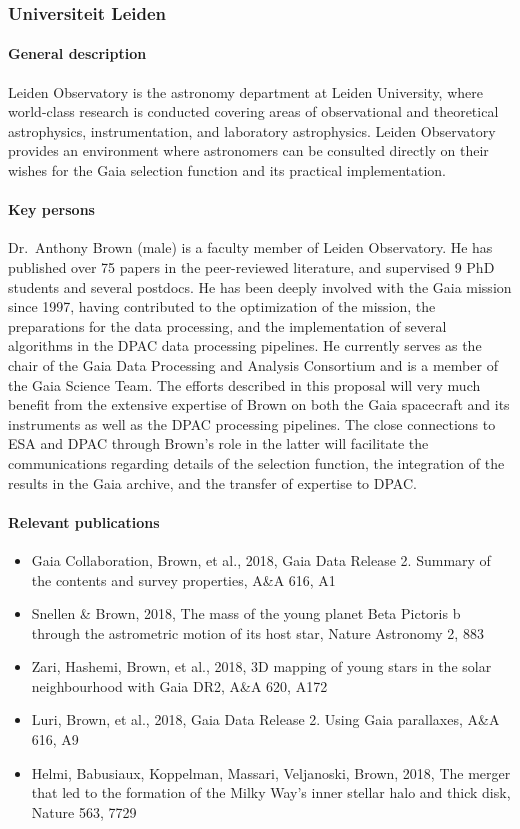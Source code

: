 \subsubsection{Universiteit Leiden}
\label{sec:ulei}

\paragraph{General description}
Leiden Observatory is the astronomy department at Leiden University, 
where world-class research is conducted covering areas of observational 
and theoretical astrophysics, instrumentation, and laboratory astrophysics. 
Leiden Observatory provides an environment where astronomers can
be consulted directly on their wishes for the Gaia selection function and
its practical implementation.

\paragraph{Key persons}
Dr.~Anthony Brown (male) is a faculty member of Leiden Observatory. He has published over 75 papers in the peer-reviewed literature, and supervised 9 PhD students and several postdocs. He has been deeply involved with the Gaia mission since 1997, having contributed to the optimization of the mission, the preparations for the data processing, and the implementation of several algorithms in the DPAC data processing pipelines. He currently serves as the chair of the Gaia Data Processing and Analysis Consortium and is a member of the Gaia Science Team. The efforts described in this proposal will very much benefit from the extensive expertise of Brown on both the Gaia spacecraft and its instruments as well as the DPAC processing pipelines. The close connections to ESA and DPAC through Brown's role in the latter will facilitate the communications regarding details of the selection function, the integration of the results in the Gaia archive, and the transfer of expertise to DPAC.

\paragraph{Relevant publications}
\begin{itemize}
    \item Gaia Collaboration, Brown, et al., 2018, Gaia Data Release 2. Summary of the contents and survey properties, A\&A 616, A1 
    \item Snellen \& Brown, 2018, The mass of the young planet Beta Pictoris b through the astrometric motion of its host star, Nature Astronomy 2, 883 
    \item Zari, Hashemi, Brown, et al., 2018, 3D mapping of young stars in the solar neighbourhood with Gaia DR2, A\&A 620, A172 
    \item  Luri, Brown, et al., 2018, Gaia Data Release 2. Using Gaia parallaxes, A\&A 616, A9 
    \item Helmi, Babusiaux, Koppelman, Massari, Veljanoski, Brown, 2018, The merger that led to the formation of the Milky Way's inner stellar halo and thick disk, Nature 563, 7729 
\end{itemize}

